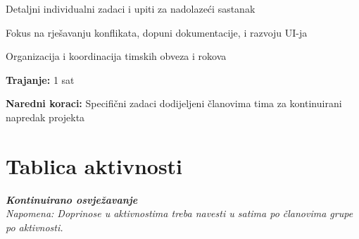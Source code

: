 \begin{packed_enum}
\begin{packed_item}
\begin{packed_item}
                \item Detaljni individualni zadaci i upiti za nadolazeći sastanak
                \item Fokus na rješavanju konflikata, dopuni dokumentacije, i razvoju UI-ja
                \item Organizacija i koordinacija timskih obveza i rokova
            \end{packed_item}
        \item \textbf{Trajanje:} 1 sat
        \item \textbf{Naredni koraci:} Specifični zadaci dodijeljeni članovima tima za kontinuirani napredak projekta
    \end{packed_item}

			
		\end{packed_enum}
		
		\eject
		\section*{Tablica aktivnosti}
		
			\textbf{\textit{Kontinuirano osvježavanje}}\\
			
			 \textit{Napomena: Doprinose u aktivnostima treba navesti u satima po članovima grupe po aktivnosti.}


